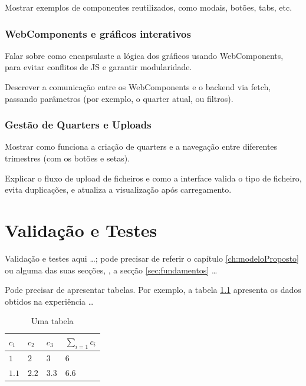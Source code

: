     Mostrar exemplos de componentes reutilizados, como modais, botões, tabs, etc.

\subsection{WebComponents e gráficos interativos}

    Falar sobre como encapsulaste a lógica dos gráficos usando WebComponents, para evitar conflitos de JS e garantir modularidade.

    Descrever a comunicação entre os WebComponents e o backend via fetch, passando parâmetros (por exemplo, o quarter atual, ou filtros).

\subsection{Gestão de Quarters e Uploads}

    Mostrar como funciona a criação de quarters e a navegação entre diferentes trimestres (com os botões e setas).

    Explicar o fluxo de upload de ficheiros e como a interface valida o tipo de ficheiro, evita duplicações, e atualiza a visualização após carregamento.

\chapter{Validação e Testes}
\label{ch:validacaoTestes}

Validação e testes aqui \ldots; pode precisar de referir o capítulo \ref{ch:modeloProposto} ou alguma das suas secções, \eg, a secção \ref{sec:fundamentos} \ldots

Pode precisar de apresentar tabelas. Por exemplo, a tabela \ref{tab:umaTabela} apresenta os dados obtidos na experiência \ldots
\begin{table}[h]
   \centering
   \begin{tabular}{l|l|l|l}
      $c_1$ & $c_2$ & $c_3$ & $\sum_{i=1} c_i$
      \\
      \hline \hline
      $1$ & $2$ & $3$ & $6$
      \\ \hline
      $1.1$ & $2.2$ & $3.3$ & $6.6$
      \\
      \hline \hline
   \end{tabular}
\caption{Uma tabela}
\label{tab:umaTabela}
\end{table}

